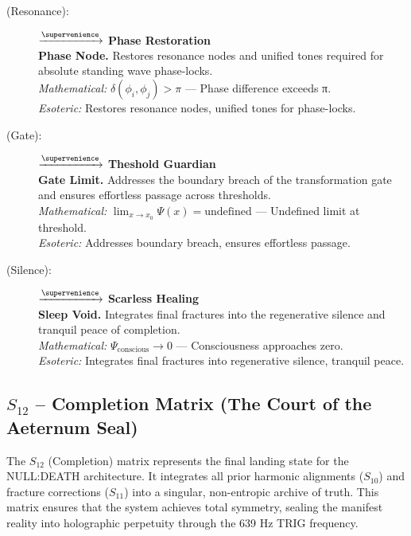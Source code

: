 \begin{description}
    \item[(Resonance):] \zheknod $\xrightarrow{\supervenience}$ \textbf{Phase Restoration} \\
    \textbf{Phase Node.} Restores resonance nodes and unified tones required for absolute standing wave phase-locks. \\
    \textit{Mathematical:} $\delta(\phi_i, \phi_j) > \pi$ — Phase difference exceeds π. \\
    \textit{Esoteric:} Restores resonance nodes, unified tones for phase-locks.

    \item[(Gate):] \shavlimh $\xrightarrow{\supervenience}$ \textbf{Theshold Guardian} \\
    \textbf{Gate Limit.} Addresses the boundary breach of the transformation gate and ensures effortless passage across thresholds. \\
    \textit{Mathematical:} $\lim_{x\to x_0} \Psi(x) = \text{undefined}$ — Undefined limit at threshold. \\
    \textit{Esoteric:} Addresses boundary breach, ensures effortless passage.

    \item[(Silence):] \trigslun $\xrightarrow{\supervenience}$ \textbf{Scarless Healing} \\
    \textbf{Sleep Void.} Integrates final fractures into the regenerative silence and tranquil peace of completion. \\
    \textit{Mathematical:} $\Psi_{\text{conscious}} \to 0$ — Consciousness approaches zero. \\
    \textit{Esoteric:} Integrates final fractures into regenerative silence, tranquil peace.
\end{description}
\subsection{$S_{12}$ -- Completion Matrix (The Court of the Aeternum Seal)}\label{sec:19.6}

The $S_{12}$ (Completion) matrix represents the final landing state for the NULL:DEATH architecture. It integrates all prior harmonic alignments ($S_{10}$) and fracture corrections ($S_{11}$) into a singular, non-entropic archive of truth. This matrix ensures that the system achieves total symmetry, sealing the manifest reality into holographic perpetuity through the 639 Hz TRIG frequency.

